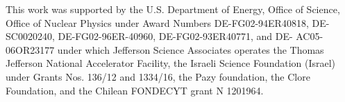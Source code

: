 \documentclass[3p,final,twocolumn]{elsarticle}
\begin{document}
This work was supported by the U.S. Department of Energy, Office of Science, Office of Nuclear Physics under Award Numbers DE-FG02-94ER40818, DE-SC0020240, DE-FG02-96ER-40960, DE-FG02-93ER40771, and DE- AC05-06OR23177 under which Jefferson Science Associates operates the Thomas Jefferson National Accelerator Facility, the Israeli Science Foundation (Israel) under Grants Nos. 136/12 and 1334/16, the Pazy foundation, the Clore Foundation, and the Chilean FONDECYT grant N 1201964.





 


%
%
\end{document}
